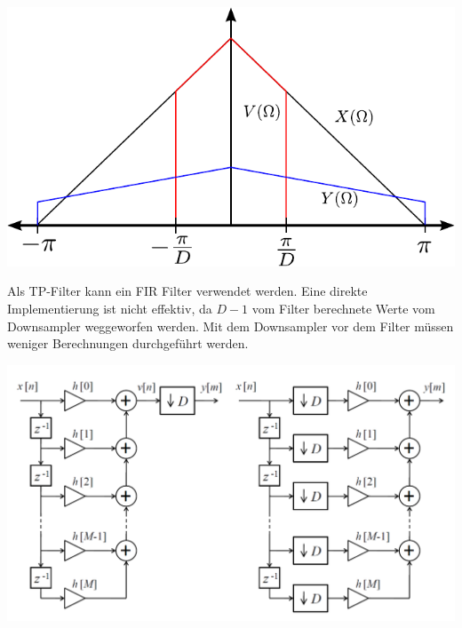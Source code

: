 \begin{center}
	\includegraphics[scale=.6]{../fig/decimation_frequenz}
\end{center}
Als TP-Filter kann ein FIR Filter verwendet werden. Eine direkte Implementierung
ist nicht effektiv, da $D-1$ vom Filter berechnete Werte vom Downsampler
weggeworfen werden. Mit dem Downsampler vor dem Filter müssen weniger
Berechnungen durchgeführt werden.
\begin{center}
	\includegraphics[scale=.7]{../fig/decimation_scheme}
\end{center}

